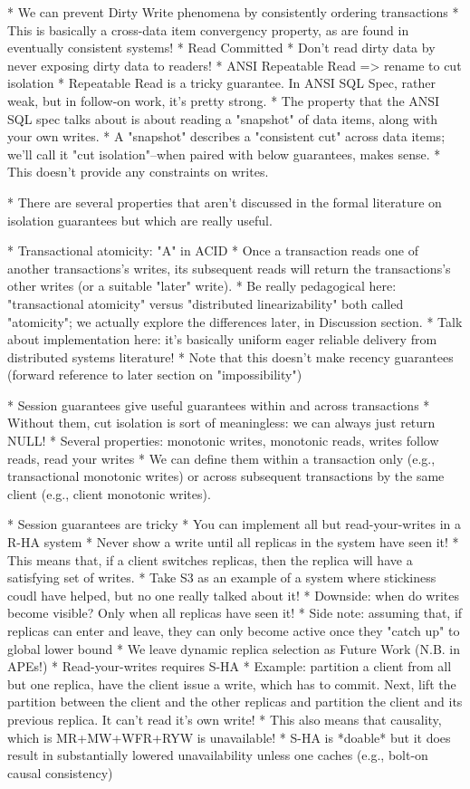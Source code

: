 * We can prevent Dirty Write phenomena by consistently ordering transactions
	* This is basically a cross-data item convergency property, as are found in eventually consistent systems!
* Read Committed
	* Don't read dirty data by never exposing dirty data to readers!
* ANSI Repeatable Read => rename to cut isolation
	* Repeatable Read is a tricky guarantee. In ANSI SQL Spec, rather weak, but in follow-on work, it's pretty strong.
	* The property that the ANSI SQL spec talks about is about reading a "snapshot" of data items, along with your own writes.
		* A "snapshot" describes a "consistent cut" across data items; we'll call it "cut isolation"--when paired with below guarantees, makes sense.
	* This doesn't provide any constraints on writes.

* There are several properties that aren't discussed in the formal literature on isolation guarantees but which are really useful.

* Transactional atomicity: "A" in ACID
	* Once a transaction reads one of another transactions's writes, its subsequent reads will return the transactions's other writes (or a suitable "later" write).
	* Be really pedagogical here: "transactional atomicity" versus "distributed linearizability" both called "atomicity"; we actually explore the differences later, in Discussion section.
	* Talk about implementation here: it's basically uniform eager reliable delivery from distributed systems literature!
	* Note that this doesn't make recency guarantees (forward reference to later section on "impossibility")

* Session guarantees give useful guarantees within and across transactions
	* Without them, cut isolation is sort of meaningless: we can always just return NULL!
	* Several properties: monotonic writes, monotonic reads, writes follow reads, read your writes
	* We can define them within a transaction only (e.g., transactional monotonic writes) or across subsequent transactions by the same client (e.g., client monotonic writes).

* Session guarantees are tricky
	* You can implement all but read-your-writes in a R-HA system
		* Never show a write until all replicas in the system have seen it!
		* This means that, if a client switches replicas, then the replica will have a satisfying set of writes.
                * Take S3 as an example of a system where stickiness coudl have helped, but no one really talked about it!
		* Downside: when do writes become visible? Only when all replicas have seen it!
		* Side note: assuming that, if replicas can enter and leave, they can only become active once they "catch up" to global lower bound
			* We leave dynamic replica selection as Future Work (N.B. in APEs!)
	* Read-your-writes requires S-HA
		* Example: partition a client from all but one replica, have the client issue a write, which has to commit. Next, lift the partition between the client and the other replicas and partition the client and its previous replica. It can't read it's own write!
		* This also means that causality, which is MR+MW+WFR+RYW is unavailable!
		* S-HA is *doable* but it does result in substantially lowered unavailability unless one caches (e.g., bolt-on causal consistency)

